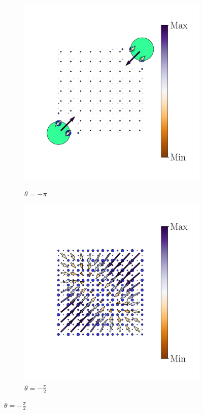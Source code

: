 \begin{figure}[h!]
     
     \begin{minipage}[h!]{1.1\textwidth}
          \begin{subfigure}[b!]{0.2 \textwidth}
             \caption{$\theta = -\pi$}
             \includegraphics[width=\textwidth]{Imagenes/Resultados_pump_Cuadrado/xy/hoti_pomp_xy_neg1.pdf}
             \label{}
         \end{subfigure}\hspace*{-0.5em}
          \begin{subfigure}[b!]{0.2 \textwidth}
             \caption*{$\theta = -\frac{\pi}{2}$}
             \includegraphics[width=\textwidth]{Imagenes/Resultados_pump_Cuadrado/xy/hoti_pomp_xy_neg2.pdf}

\end{subfigure}
\end{minipage}
\end{figure}
